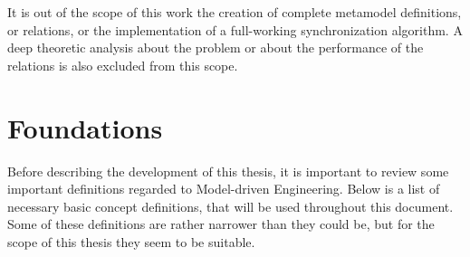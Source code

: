 \documentclass[tuberlin,cic,tc,english,noabntcite]{iiufrgs}
\begin{document}
It is out of the scope of this work the creation of complete metamodel definitions, or relations, or the implementation of a full-working synchronization algorithm. A deep theoretic analysis about the problem or about the performance of the relations is also excluded from this scope.

\chapter{Foundations}
\label{ch:foundations}
Before describing the development of this thesis, it is important to review some important definitions regarded to Model-driven Engineering. Below is a list of necessary basic concept definitions, that will be used throughout this document. Some of these definitions are rather narrower than they could be, but for the scope of this thesis they seem to be suitable.
\end{document}
